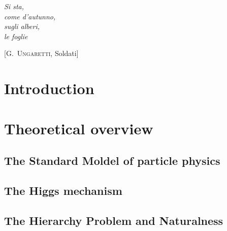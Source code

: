 \documentclass[10pt,twoside,cucitura,classica,english,openany]{toptesi}
\begin{document}




\english

\cleardoublepage

\frontespizio
\paginavuota
\begin{dedica}
\end{dedica}

\ringraziamenti

\tablespagetrue\figurespagetrue \indici

\begin{citazioni}
  \textit{Si sta,\\come d'autunno,\\sugli alberi,\\le foglie }

  [\textsc{G.~Ungaretti}, Soldati]
\end{citazioni}


\chapter*{Introduction}
\label{cha:intro}


\mainmatter



\chapter{Theoretical overview}
\label{cha:theoretical-overview}

\section{The Standard Moldel of particle physics}
\label{sec:stand-mold-part}



\section{The Higgs mechanism}
\label{sec:higgs-mechanism}



\section{The Hierarchy Problem and Naturalness}
\label{sec:hier-probl-natur}
\end{document}
